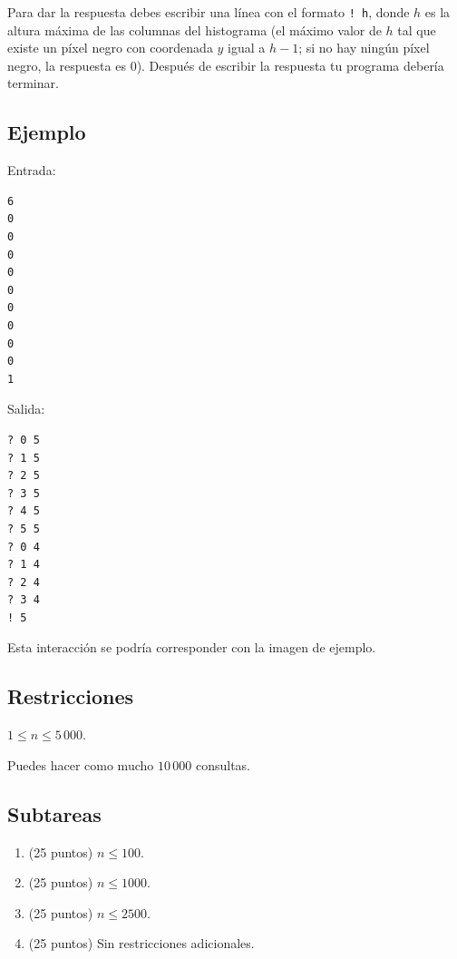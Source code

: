 \documentclass[10.5pt]{article}
\begin{document}
Para dar la respuesta debes escribir una l\'inea con el formato \verb#! h#, donde $h$ es la altura m\'axima de las columnas del histograma (el m\'aximo valor de $h$ tal que existe un p\'ixel negro con coordenada $y$ igual a $h-1$; si no hay ning\'un p\'ixel negro, la respuesta es $0$). Despu\'es de escribir la respuesta tu programa deber\'ia terminar.

\newpage

\subsection*{Ejemplo}

Entrada:
\begin{verbatim}
6
0
0
0
0
0
0
0
0
0
1
\end{verbatim}



Salida:
\begin{verbatim}
? 0 5
? 1 5
? 2 5
? 3 5
? 4 5
? 5 5
? 0 4
? 1 4
? 2 4
? 3 4
! 5
\end{verbatim}

Esta interacci\'on se podr\'ia corresponder con la imagen de ejemplo.

\subsection*{Restricciones}

$1 \leq n \leq 5\,000$.

Puedes hacer como mucho $10\,000$ consultas.

\subsection*{Subtareas}

\begin{enumerate}
    \item (25 puntos) $n \leq 100$.
    \item (25 puntos) $n \leq 1000$.
    \item (25 puntos) $n \leq 2500$.
    \item (25 puntos) Sin restricciones adicionales.
    
\end{enumerate}
\end{document}
